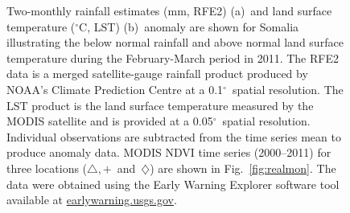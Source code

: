 \documentclass[authoryear,preprint,review,10pt]{elsarticle}
\newcommand{\degree}{\ensuremath{^\circ}}
\begin{document}
\begin{figure} [htp]
\centering
{} %
 \caption{Two-monthly rainfall estimates (mm, RFE2) (a)~and land surface temperature (\degree C, LST) (b)~anomaly are shown for Somalia illustrating the below normal rainfall and above normal land surface temperature during the February-March period in 2011. The RFE2 data is a merged satellite-gauge rainfall product produced by NOAA's Climate Prediction Centre at a 0.1\degree~spatial resolution. The LST product is the land surface temperature measured by the MODIS satellite and is provided at a 0.05\degree~spatial resolution. Individual observations are subtracted from the time series mean to produce anomaly data. MODIS NDVI time series (2000--2011) for three locations ($\triangle,+$~and~$\diamondsuit$) are shown in Fig.~\ref{fig:realmon}. The data were obtained using the Early Warning Explorer software tool available at \url{earlywarning.usgs.gov}. }
 \label{fig:RF_LSTSomalia}
\end{figure}
\end{document}
